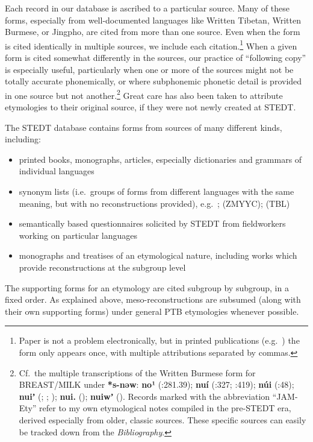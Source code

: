 Each record in our database is ascribed to a particular source. Many of these forms, especially from well-documented languages like Written Tibetan, Written Burmese, or Jingpho, are cited from more than one source. Even when the form is cited identically in multiple sources, we include each citation.\footnote{Paper is not a problem electronically, but in printed publications (e.g.\ \textit{}) the form only appears once, with multiple attributions separated by commas.} When a given form is cited somewhat differently in the sources, our practice of “following copy” is especially useful, particularly when one or more of the sources might not be totally accurate phonemically, or where subphonemic phonetic detail is provided in one source but not another.\footnote{Cf.\ the
multiple transcriptions of the Written Burmese form for BREAST/MILK under
\textbf{*s-nəw}:  \textbf{no¹}
(\citealt{ZMYYC}:281.39); \textbf{nuí} (\citealt{AW-TBT}:327; \textit{}:419); \textbf{núi}
(\citealt{WSC-SH}:48); \textbf{nuiʼ} (\citealt{JAM-Ety}; \citealt{GEM-CNL}; \citealt{PKB-WBRD});
\textbf{nui.} (\citealt{GEM-CNL}); \textbf{nuiwʼ} (\citealt{GHL-PPB}). Records marked with the abbreviation “JAM-Ety” refer to my own etymological notes compiled in the pre-STEDT era, derived especially from older, classic sources. These specific sources can easily be tracked down from the \textit{Bibliography}.} Great care has also been taken to attribute etymologies to their original source, if they were not newly created at STEDT.

The STEDT database contains forms from sources of many different kinds,
including:
\begin{itemize}
\item printed books, monographs, articles, especially dictionaries and grammars of
individual languages
\item synonym lists (i.e.\ groups of forms from different languages with the same
meaning, but with no reconstructions provided), e.g.\ \citealt{GHL-PPB};
 \citealt{ZMYYC} (ZMYYC); \citealt{TBL} (TBL)
\item semantically based questionnaires solicited by STEDT from fieldworkers working
on particular languages
\item monographs and treatises of an etymological nature, including works which
provide reconstructions at the subgroup level
\end{itemize}

The supporting forms for an etymology are cited subgroup by subgroup, in a fixed order. As explained above, meso-reconstructions are subsumed (along with their own supporting forms) under general PTB etymologies whenever possible.

